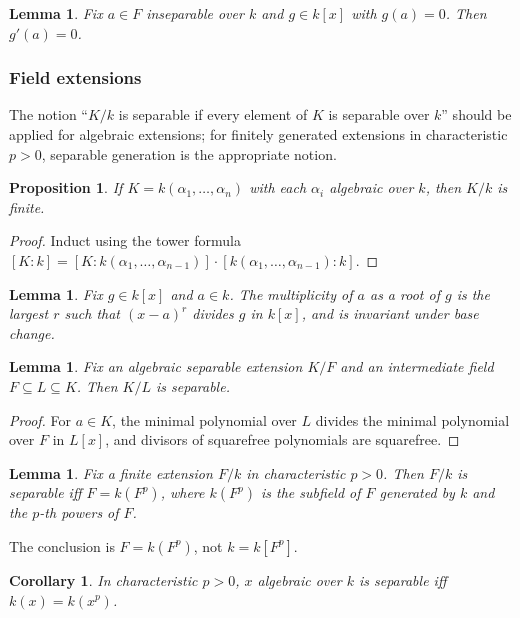 \documentclass[12pt]{article}
\theoremstyle{plain}
\newtheorem{proposition}[thm]{Proposition}
\newtheorem{lemma}[thm]{Lemma}
\newtheorem{cor}[thm]{Corollary}
\theoremstyle{definition}
\begin{document}
\begin{lemma}
Fix $a\in F$ inseparable over $k$ and $g\in k[x]$ with $g(a)=0$. Then $g'(a)=0$.
\end{lemma}

\subsubsection*{Field extensions}

The notion ``$K/k$ is separable if every element of $K$ is separable over $k$'' should be applied for algebraic extensions; for finitely generated extensions in characteristic $p>0$, separable generation is the appropriate notion.

\begin{proposition}
If $K=k(\alpha_1,\ldots,\alpha_n)$ with each $\alpha_i$ algebraic over $k$, then $K/k$ is finite.
\end{proposition}
\begin{proof}
Induct using the tower formula $[K:k]=[K:k(\alpha_1,\ldots,\alpha_{n-1})]\cdot[k(\alpha_1,\ldots,\alpha_{n-1}):k]$.
\end{proof}

\begin{lemma}
Fix $g\in k[x]$ and $a\in k$. The multiplicity of $a$ as a root of $g$ is the largest $r$ such that $(x-a)^r$ divides $g$ in $k[x]$, and is invariant under base change.
\end{lemma}

\begin{lemma}
Fix an algebraic separable extension $K/F$ and an intermediate field $F\subseteq L\subseteq K$. Then $K/L$ is separable.
\end{lemma}
\begin{proof}
For $a\in K$, the minimal polynomial over $L$ divides the minimal polynomial over $F$ in $L[x]$, and divisors of squarefree polynomials are squarefree.
\end{proof}

\begin{lemma}
Fix a finite extension $F/k$ in characteristic $p>0$. Then $F/k$ is separable iff $F=k(F^p)$, where $k(F^p)$ is the subfield of $F$ generated by $k$ and the $p$-th powers of $F$.
\end{lemma}

The conclusion is $F=k(F^p)$, not $k=k[F^p]$.

\begin{cor}
In characteristic $p>0$, $x$ algebraic over $k$ is separable iff $k(x)=k(x^p)$.
\end{cor}
\end{document}
